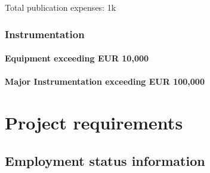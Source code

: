 \documentclass[10pt,fleqn,twoside]{article}
\begin{document}
Total publication expenses: 1k\EUR{}

\subsubsection{Instrumentation}

\todo{[Text]}

\paragraph{Equipment exceeding EUR 10,000} 

\todo{[Text]}

\paragraph{Major Instrumentation exceeding EUR 100,000} 

\todo{[Text]}

% 
% 
% 
% 
% 
% 
% 

\section{Project requirements}
\renewcommand{\leftmark}{\sc Project requirements}

\subsection{Employment status information}

\todo{[Text]}
\end{document}
